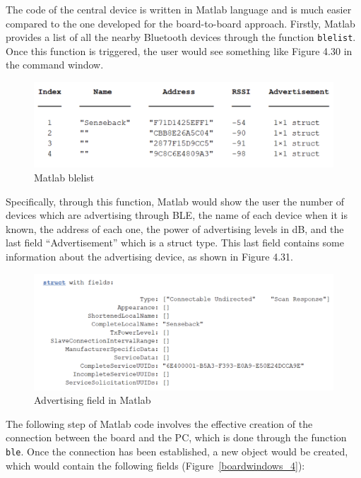 \documentclass{Configuration_Files/PoliMi3i_thesis}
\begin{document}
The code of the central device is written in Matlab language and is much easier compared to the one developed for the board-to-board approach. Firstly, Matlab provides a list of all the nearby Bluetooth devices through the function \texttt{blelist}. Once this function is triggered, the user would see something like Figure 4.30 in the command window.

\begin{figure}[H]
    \centering
    \includegraphics[scale=0.6]{Board Windows PC/2.png}
    \caption{Matlab blelist}
    \label{boardwindows_2}
\end{figure}

Specifically, through this function, Matlab would show the user the number of devices which are advertising through BLE, the name of each device when it is known, the address of each one, the power of advertising levels in dB, and the last field “Advertisement” which is a struct type. This last field contains some information about the advertising device, as shown in Figure 4.31.

\begin{figure}[H]
    \centering
    \includegraphics[scale=0.6]{Board Windows PC/3.png}
    \caption{Advertising field in Matlab}
    \label{boardwindows_3}
\end{figure}

The following step of Matlab code involves the effective creation of the connection between the board and the PC, which is done through the function \texttt{ble}. Once the connection has been established, a new object would be created, which would contain the following fields (Figure~\ref{boardwindows_4}):
\end{document}
